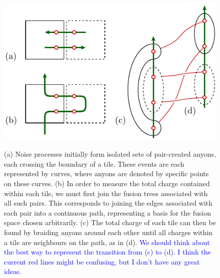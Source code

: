 \documentclass[aps, prl, letterpaper, twocolumn, superscriptaddress, notitlepage, 10pt]{revtex4-1}
\newcommand{\cggb}[1]{\textcolor{blue}{#1}}
\begin{document}
\begin{figure}[th!]
\begin{center}
	\includegraphics[width=1.0\columnwidth]{pic-syndrome.pdf}\\
\caption{(a) Noise processes initially form isolated sets of pair-created anyons, each crossing the boundary of a tile. These events are each represented by curves, where anyons are denoted by specific points on these curves. (b) In order to measure the total charge contained within each tile, we must first join the fusion trees associated with all such pairs. This corresponds to joining the edges associated with each pair into a continuous path, representing a basis for the fusion space chosen arbitrarily. (c) The total charge of each tile can then be found by braiding anyons around each other until all charges within a tile are neighbours on the path, as in (d). \cggb{We should think about the best way to represent the transition from (c) to (d). I think the current red lines might be confusing, but I don't have any great ideas.}}
\label{f:syndrome}
\end{center}
\end{figure}
\end{document}
